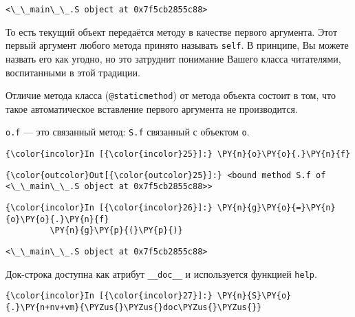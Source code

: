     \begin{Verbatim}[commandchars=\\\{\}]
<\_\_main\_\_.S object at 0x7f5cb2855c88>

    \end{Verbatim}

    То есть текущий объект передаётся методу в качестве первого аргумента.
Этот первый аргумент любого метода принято называть \texttt{self}. В
принципе, Вы можете назвать его как угодно, но это затруднит понимание
Вашего класса читателями, воспитанными в этой традиции.

Отличие метода класса (\texttt{@staticmethod}) от метода объекта состоит
в том, что такое автоматическое вставление первого аргумента не
производится.

\texttt{o.f} --- это связанный метод: \texttt{S.f} связанный с объектом
\texttt{o}.

    \begin{Verbatim}[commandchars=\\\{\}]
{\color{incolor}In [{\color{incolor}25}]:} \PY{n}{o}\PY{o}{.}\PY{n}{f}
\end{Verbatim}

            \begin{Verbatim}[commandchars=\\\{\}]
{\color{outcolor}Out[{\color{outcolor}25}]:} <bound method S.f of <\_\_main\_\_.S object at 0x7f5cb2855c88>>
\end{Verbatim}
        
    \begin{Verbatim}[commandchars=\\\{\}]
{\color{incolor}In [{\color{incolor}26}]:} \PY{n}{g}\PY{o}{=}\PY{n}{o}\PY{o}{.}\PY{n}{f}
         \PY{n}{g}\PY{p}{(}\PY{p}{)}
\end{Verbatim}

    \begin{Verbatim}[commandchars=\\\{\}]
<\_\_main\_\_.S object at 0x7f5cb2855c88>

    \end{Verbatim}

    Док-строка доступна как атрибут \texttt{\_\_doc\_\_} и используется
функцией \texttt{help}.

    \begin{Verbatim}[commandchars=\\\{\}]
{\color{incolor}In [{\color{incolor}27}]:} \PY{n}{S}\PY{o}{.}\PY{n+nv+vm}{\PYZus{}\PYZus{}doc\PYZus{}\PYZus{}}
\end{Verbatim}

